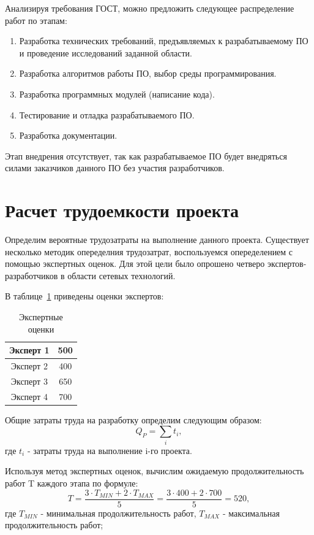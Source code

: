 Анализируя требования ГОСТ, можно предложить следующее распределение работ по этапам:
\begin{enumerate}[1.]
\item Разработка технических требований, предъявляемых к разрабатываемому ПО и проведение исследований заданной области.
\item Разработка алгоритмов работы ПО, выбор среды программирования.
\item Разработка программных модулей (написание кода).
\item Тестирование и отладка разрабатываемого ПО.
\item Разработка документации.
\end{enumerate}

Этап внедрения отсутствует, так как разрабатываемое ПО будет внедряться силами заказчиков данного ПО без участия разработчиков.

\section{Расчет трудоемкости проекта}
Определим вероятные трудозатраты на выполнение данного проекта. Существует несколько методик опеределния трудозатрат, воспользуемся опеределением с помощью экспертных оценок. Для этой цели было опрошено четверо экспертов-разработчиков в области сетевых технологий.

В таблице~\ref{table:expert_marks} приведены оценки экспертов:

\begin{table}
\centering
\caption{Экспертные оценки}
\label{table:expert_marks}
\begin{tabular} {| c | c |} 
\hline
Эксперт 1 & 500\\
\hline
Эксперт 2 & 400\\
\hline
Эксперт 3 & 650\\
\hline
Эксперт 4 & 700\\
\hline
\end{tabular}
\end{table}

Общие затраты труда на разработку определим следующим образом:
\begin{equation}
Q_{P} = \sum_{i}t_i,
\end{equation}
где $t_{i}$ - затраты труда на выполнение i-го проекта.

Используя метод экспертных оценок, вычислим ожидаемую продолжительность работ T каждого этапа по формуле:
\begin{equation}
T = \frac{3 \cdot T_{MIN} + 2 \cdot T_{MAX}} {5} = \frac{3 \cdot 400 + 2 \cdot 700} {5} = 520,
\end{equation}
где $T_{MIN}$ - минимальная продолжительность работ, $T_{MAX}$ - максимальная продолжительность работ;

